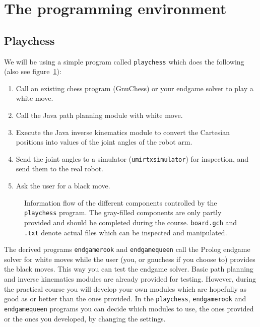 \documentclass[10pt]{scrartcl}
\begin{document}

\section{The programming environment}
\label{sec:programmingenvironment}

\subsection{Playchess}
\label{sec:playchess}

We will be using a simple program called {\tt playchess} which does
the following (also see figure~\ref{fig:chain2}):

\begin{enumerate}
\addtolength{\itemsep}{-.1cm}
\item Call an existing chess program (GnuChess) or your endgame solver
      to play a white move.
\item Call the Java path planning module with white move.
\item Execute the Java inverse kinematics module to convert the
      Cartesian positions into values of the joint angles of the robot arm.
\item Send the joint angles to a simulator ({\tt umirtxsimulator}) for
      inspection, and send them to the real robot.
\item Ask the user for a black move.
\end{enumerate}
\begin{figure}%
  \centerline{}
  \caption{Information flow of the different components controlled by the
  {\tt playchess} program. The gray-filled components are only partly
  provided and should be completed during the course. {\tt board.gch}
  and {\tt *.txt} denote actual files which can be inspected and
  manipulated.}
  \label{fig:chain2}
\end{figure}
The derived programs {\tt endgamerook} and {\tt endgamequeen} call the
Prolog endgame solver for white moves while the user (you, or gnuchess if you
choose to) provides the black moves. This way you can test the endgame solver.
Basic path planning and inverse kinematics modules are already
provided for testing. However, during the practical course you will
develop your own modules which are hopefully as good as or better than
the ones provided. In the {\tt playchess}, {\tt endgamerook} and {\tt
endgamequeen} programs you can decide which modules to use, the ones
provided or the ones you developed, by changing the settings.
\end{document}
